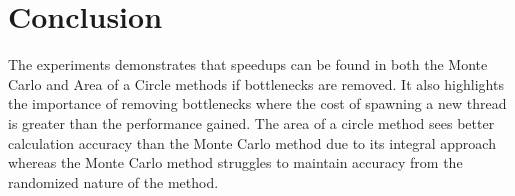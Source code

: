 \documentclass[conference]{IEEEtran}
\begin{document}
\section{Conclusion}
The experiments demonstrates that speedups can be found in both the Monte Carlo and Area of a Circle methods if bottlenecks are removed.
It also highlights the importance of removing bottlenecks where the cost of spawning a new thread is greater than the performance gained.
The area of a circle method sees better calculation accuracy than the Monte Carlo method due to its integral approach whereas the Monte Carlo method struggles to maintain accuracy from the randomized nature of the method.
\end{document}

